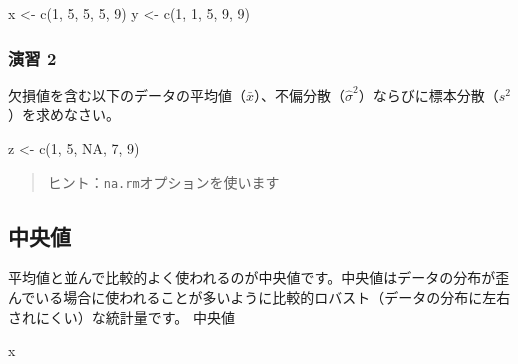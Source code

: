 \documentclass[
  12pt,
]{book}
\newenvironment{Shaded}{\begin{snugshade}}{\end{snugshade}}
\newcommand{\ConstantTok}[1]{\textcolor[rgb]{0.00,0.00,0.00}{#1}}
\newcommand{\DecValTok}[1]{\textcolor[rgb]{0.00,0.00,0.81}{#1}}
\newcommand{\FunctionTok}[1]{\textcolor[rgb]{0.00,0.00,0.00}{#1}}
\newcommand{\NormalTok}[1]{#1}
\newcommand{\OtherTok}[1]{\textcolor[rgb]{0.56,0.35,0.01}{#1}}
\begin{document}
\begin{Shaded}
\begin{Highlighting}[]
\NormalTok{x }\OtherTok{\textless{}{-}} \FunctionTok{c}\NormalTok{(}\DecValTok{1}\NormalTok{, }\DecValTok{5}\NormalTok{, }\DecValTok{5}\NormalTok{, }\DecValTok{5}\NormalTok{, }\DecValTok{9}\NormalTok{)}
\NormalTok{y }\OtherTok{\textless{}{-}} \FunctionTok{c}\NormalTok{(}\DecValTok{1}\NormalTok{, }\DecValTok{1}\NormalTok{, }\DecValTok{5}\NormalTok{, }\DecValTok{9}\NormalTok{, }\DecValTok{9}\NormalTok{)}
\end{Highlighting}
\end{Shaded}

\hypertarget{ux6f14ux7fd2-2}{%
\subsubsection*{演習 2}\label{ux6f14ux7fd2-2}}

欠損値を含む以下のデータの平均値（\(\bar{x}\)）、不偏分散（\(\hat{\sigma}^2\)）ならびに標本分散（\(s^2\)）を求めなさい。

\begin{Shaded}
\begin{Highlighting}[]
\NormalTok{z }\OtherTok{\textless{}{-}} \FunctionTok{c}\NormalTok{(}\DecValTok{1}\NormalTok{, }\DecValTok{5}\NormalTok{, }\ConstantTok{NA}\NormalTok{, }\DecValTok{7}\NormalTok{, }\DecValTok{9}\NormalTok{)}
\end{Highlighting}
\end{Shaded}

\begin{quote}
ヒント：\texttt{na.rm}オプションを使います
\end{quote}

\hypertarget{ux4e2dux592eux5024}{%
\subsection{中央値}\label{ux4e2dux592eux5024}}

平均値と並んで比較的よく使われるのが中央値です。中央値はデータの分布が歪んでいる場合に使われることが多いように比較的ロバスト（データの分布に左右されにくい）な統計量です。 中央値

\begin{Shaded}
\begin{Highlighting}[]
\NormalTok{x}
\end{Highlighting}
\end{Shaded}
\end{document}
